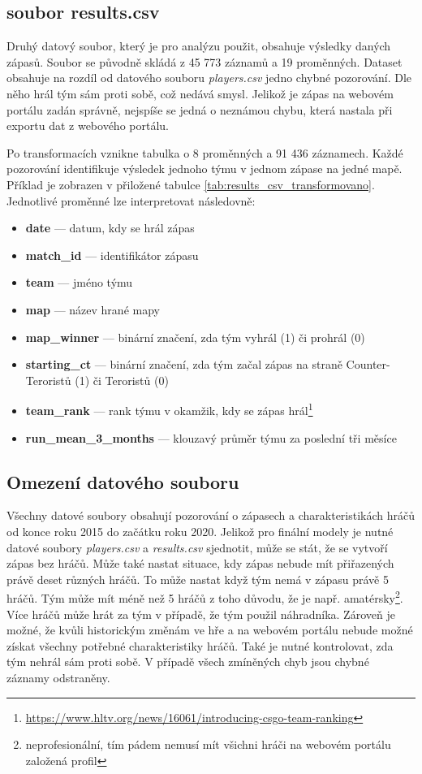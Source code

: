 \subsection{soubor results.csv}
Druhý datový soubor, který je pro analýzu použit, obsahuje výsledky daných zápasů. Soubor se původně skládá z 45 773 záznamů a 19 proměnných. Dataset obsahuje na rozdíl
od datového souboru \textit{players.csv} jedno chybné pozorování. Dle něho hrál tým sám proti sobě, což nedává smysl. Jelikož je zápas na webovém portálu zadán
správně, nejspíše se jedná o neznámou chybu, která nastala při exportu dat z webového portálu.

Po transformacích vznikne tabulka o 8 proměnných a 91 436 záznamech. Každé pozorování identifikuje výsledek jednoho týmu v jednom zápase
na jedné mapě. Příklad je zobrazen v přiložené tabulce \ref{tab:results_csv_transformovano}. Jednotlivé proměnné lze interpretovat následovně:
\begin{itemize}
    \item \textbf{date} --- datum, kdy se hrál zápas
    \item \textbf{match\_id} --- identifikátor zápasu
    \item \textbf{team} --- jméno týmu
    \item \textbf{map} --- název hrané mapy
    \item \textbf{map\_winner} --- binární značení, zda tým vyhrál (1) či prohrál (0)
    \item \textbf{starting\_ct} --- binární značení, zda tým začal zápas na straně Counter-Teroristů (1) či Teroristů (0)
    \item \textbf{team\_rank} --- rank týmu v okamžik, kdy se zápas hrál\footnote{\url{https://www.hltv.org/news/16061/introducing-csgo-team-ranking}}
    \item \textbf{run\_mean\_3\_months} --- klouzavý průměr týmu za poslední tři měsíce
\end{itemize}

\subsection{Omezení datového souboru}
{\color{red}
Všechny datové soubory obsahují pozorování o zápasech a charakteristikách hráčů od konce roku 2015 do začátku roku 2020. Jelikož pro finální modely je nutné datové soubory
\textit{players.csv} a \textit{results.csv} sjednotit, může se stát, že se vytvoří zápas bez hráčů. Může také nastat situace, kdy zápas nebude mít přiřazených právě 
deset různých hráčů. To může nastat když tým nemá v zápasu právě 5 hráčů. Tým může mít méně než 5 hráčů z toho důvodu, že je např.
amatérsky\footnote{neprofesionální, tím pádem nemusí mít všichni hráči na webovém portálu založená profil}. Více hráčů může hrát za tým v případě, že tým použil náhradníka.
Zároveň je možné, že kvůli historickým změnám ve hře a na webovém portálu nebude možné získat všechny potřebné charakteristiky hráčů. Také je nutné kontrolovat,
zda tým nehrál sám proti sobě. V případě všech zmíněných chyb jsou chybné záznamy odstraněny.
}


